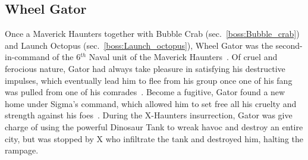 \subsection{Wheel Gator}\label{boss:Wheel_gator}
Once a Maverick Haunters together with Bubble Crab (sec.~\ref{boss:Bubble_crab}) and Launch Octopus (sec.~\ref{boss:Launch_octopus}), Wheel Gator was the second-in-command  of the 6$^{th}$ Naval unit of the Maverick Haunters~\cite{Xcoll1:Manual_X2}. Of cruel and ferocious nature, Gator had always take pleasure in satisfying his destructive impulses, which eventually lead him to flee from his group once one of his fang was pulled from one of his comrades~\cite{wayback:X2_resources}. Become a fugitive, Gator found a new home under Sigma's command, which allowed him to set free all his cruelty and strength against his foes~\cite{wiki:Wheel_gator}. During the X-Haunters insurrection, Gator was give charge of using the powerful Dinosaur Tank to wreak havoc and destroy an entire city, but was stopped by X who infiltrate the tank and destroyed him, halting the rampage.


